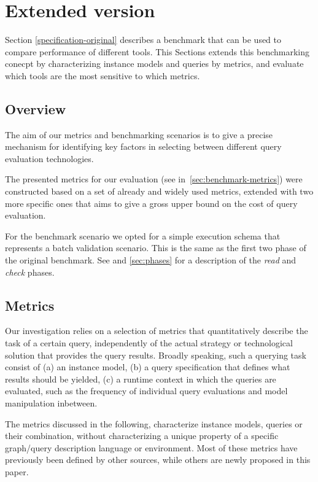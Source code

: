 \section{Extended version}
\label{specification-extended}

Section \ref{specification-original} describes a benchmark that can be used to compare performance of different tools. This Sections extends this benchmarking conecpt by characterizing instance models and queries by metrics, and evaluate which tools are the most sensitive to which metrics. 

\subsection{Overview}
\label{sec:benchmark_overview}
The aim of our metrics and benchmarking scenarios is to give a precise mechanism for identifying key factors in selecting between different query evaluation technologies.

The presented metrics for our evaluation (see in~\autoref{sec:benchmark-metrics}) were constructed based on a set of already and widely used metrics, extended with two more specific ones that aims to give a gross upper bound on the cost of query evaluation.

For the benchmark scenario we opted for a simple execution schema that represents a batch validation scenario. This is the same as the first two phase of the original benchmark. See  and \autoref{sec:phases} for a description of the \emph{read} and \emph{check} phases. 


\subsection{Metrics}
\label{sec:benchmark-metrics}

Our investigation relies on a selection of metrics that quantitatively describe
the task of a certain query, independently of the actual strategy or technological solution
that provides the query results. Broadly speaking, such a querying task consist
of (a) an instance model, (b) a query specification that defines what results
should be yielded, (c) a runtime context in which the queries are evaluated,
such as the frequency of individual query evaluations and model manipulation
inbetween.

The metrics discussed in the following, characterize instance models, queries or their combination, without characterizing a unique property of a specific graph/query description language or environment. Most of these metrics have previously been defined by other sources, while others are newly proposed in this paper.

